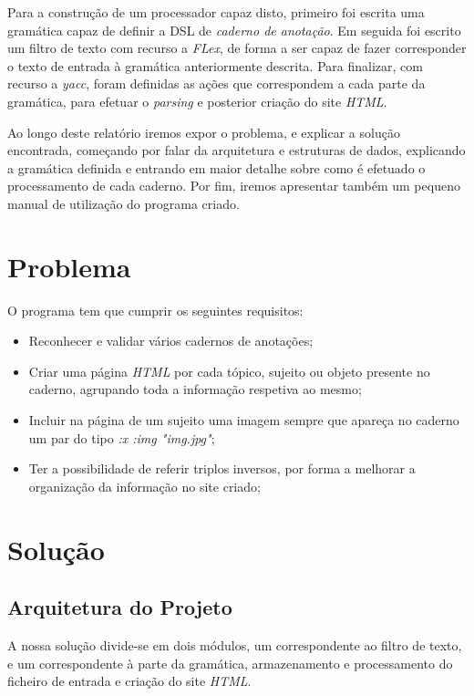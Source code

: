 \documentclass[a4paper]{report}
\begin{document}
Para a construção de um processador capaz disto, primeiro foi escrita uma
gramática capaz de definir a DSL de \textit{caderno de anotação}. Em seguida foi
escrito um filtro de texto com recurso a \textit{FLex}, de forma a ser capaz de
fazer corresponder o texto de entrada à gramática anteriormente descrita. Para
finalizar, com recurso a \textit{yacc}, foram definidas as ações que
correspondem a cada parte da gramática, para efetuar o \textit{parsing} e
posterior criação do site \textit{HTML}.

Ao longo deste relatório iremos expor o problema, e explicar a solução
encontrada, começando por falar da arquitetura e estruturas de dados, explicando
a gramática definida e entrando em maior detalhe sobre como é efetuado o
processamento de cada caderno. Por fim, iremos apresentar também um pequeno
manual de utilização do programa criado.

\chapter{Problema}

O programa tem que cumprir os seguintes requisitos:
\begin{itemize}
    \item Reconhecer e validar vários cadernos de anotações;
    \item Criar uma página \textit{HTML} por cada tópico, sujeito ou objeto
        presente no caderno, agrupando toda a informação respetiva ao mesmo;
    \item Incluir na página de um sujeito uma imagem sempre que apareça no
        caderno um par do tipo \textit{:x :img "img.jpg"};
    \item Ter a possibilidade de referir triplos inversos, por forma a melhorar
        a organização da informação no site criado;
\end{itemize}

\chapter{Solução}

\section{Arquitetura do Projeto}

A nossa solução divide-se em dois módulos, um correspondente ao filtro de texto,
e um correspondente à parte da gramática, armazenamento e processamento do
ficheiro de entrada e criação do site \textit{HTML}.
\end{document}
